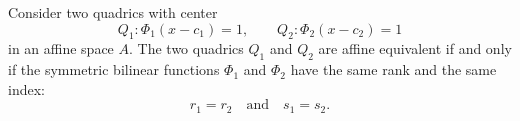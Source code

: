 Consider two quadrics with center
$$Q_1: \Phi_1(x - c_1) = 1, \qquad Q_2: \Phi_2(x - c_2) = 1$$
in an affine space $A$. The two quadrics $Q_1$ and $Q_2$ are affine equivalent if and only if the symmetric bilinear functions $\Phi_1$ and $\Phi_2$ have the same rank and the same index:
$$r_1 = r_2 \quad \text{and} \quad s_1 = s_2.$$
